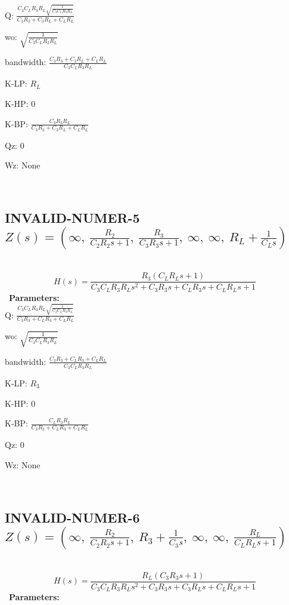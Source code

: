 \documentclass{article}
\begin{document}
Q: $\frac{C_{3} C_{L} R_{3} R_{L} \sqrt{\frac{1}{C_{3} C_{L} R_{3} R_{L}}}}{C_{3} R_{3} + C_{3} R_{L} + C_{L} R_{L}}$\ 

wo: $\sqrt{\frac{1}{C_{3} C_{L} R_{3} R_{L}}}$\ 

bandwidth: $\frac{C_{3} R_{3} + C_{3} R_{L} + C_{L} R_{L}}{C_{3} C_{L} R_{3} R_{L}}$\ 

K-LP: $R_{L}$\ 

K-HP: $0$\ 

K-BP: $\frac{C_{3} R_{3} R_{L}}{C_{3} R_{3} + C_{3} R_{L} + C_{L} R_{L}}$\ 

Qz: $0$\ 

Wz: $\text{None}$\ 

\ 

\subsection{INVALID-NUMER-5 $Z(s) = \left( \infty, \  \frac{R_{2}}{C_{2} R_{2} s + 1}, \  \frac{R_{3}}{C_{3} R_{3} s + 1}, \  \infty, \  \infty, \  R_{L} + \frac{1}{C_{L} s}\right)$ } \ 
\textbf{\[H(s) = \frac{R_{3} \left(C_{L} R_{L} s + 1\right)}{C_{3} C_{L} R_{3} R_{L} s^{2} + C_{3} R_{3} s + C_{L} R_{3} s + C_{L} R_{L} s + 1}\] } \ 
\textbf{Parameters:}\\ 

Q: $\frac{C_{3} C_{L} R_{3} R_{L} \sqrt{\frac{1}{C_{3} C_{L} R_{3} R_{L}}}}{C_{3} R_{3} + C_{L} R_{3} + C_{L} R_{L}}$\ 

wo: $\sqrt{\frac{1}{C_{3} C_{L} R_{3} R_{L}}}$\ 

bandwidth: $\frac{C_{3} R_{3} + C_{L} R_{3} + C_{L} R_{L}}{C_{3} C_{L} R_{3} R_{L}}$\ 

K-LP: $R_{3}$\ 

K-HP: $0$\ 

K-BP: $\frac{C_{L} R_{3} R_{L}}{C_{3} R_{3} + C_{L} R_{3} + C_{L} R_{L}}$\ 

Qz: $0$\ 

Wz: $\text{None}$\ 

\ 

\subsection{INVALID-NUMER-6 $Z(s) = \left( \infty, \  \frac{R_{2}}{C_{2} R_{2} s + 1}, \  R_{3} + \frac{1}{C_{3} s}, \  \infty, \  \infty, \  \frac{R_{L}}{C_{L} R_{L} s + 1}\right)$ } \ 
\textbf{\[H(s) = \frac{R_{L} \left(C_{3} R_{3} s + 1\right)}{C_{3} C_{L} R_{3} R_{L} s^{2} + C_{3} R_{3} s + C_{3} R_{L} s + C_{L} R_{L} s + 1}\] } \ 
\textbf{Parameters:}\\ 
\end{document}
